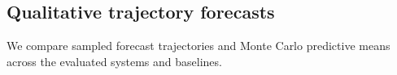 \subsection{Qualitative trajectory forecasts}
\label{sec:qualitative-trajectory-forecasts}

\providecommand{\DoublePendulumInstance}{01}
\providecommand{\DoublePendulumChaoticInstance}{02}
\providecommand{\DeterministicRosslerInstance}{01}
\providecommand{\DeterministicLorenzInstance}{01}
\providecommand{\StochasticRosslerInstance}{01}
\providecommand{\StochasticLorenzInstance}{01}

\providecommand{\StochasticLorenzDrawOne}{01}
\providecommand{\StochasticLorenzDrawTwo}{02}
\providecommand{\StochasticLorenzDrawThree}{03}
\providecommand{\StochasticLorenzDrawFour}{04}
\providecommand{\StochasticLorenzDrawFive}{05}

We compare sampled forecast trajectories and Monte Carlo predictive means
across the evaluated systems and baselines.

